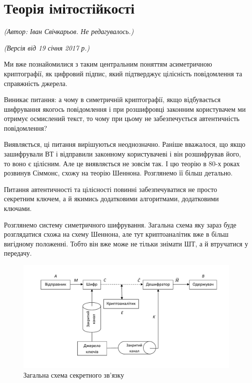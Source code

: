 \section{Теорія імітостійкості}
\begin{flushright}
\emph{(Автор: Іван Свічкарьов. Не редагувалось.)}
\par \emph{(Версія від 19 січня 2017 р.)}
\end{flushright}

Ми вже познайомилися з таким центральним поняттям асиметричною криптографії, як цифровий підпис, який підтверджує цілісність повідомлення та справжність джерела. \par
Виникає питання: а чому в симетричній криптографії, якщо відбувається шифрування якогось повідомлення і при розшифровці законним користувачем ми отримує осмислений текст, то чому при цьому не забезпечується автентичність повідомлення? \par
 Виявляється, ці питання вирішуються неоднозначно. Раніше вважалося, що якщо зашифрували ВТ і відправили законному користувачеві і він розшифрував його, то воно є цілісним. Але це виявляється не зовсім так. І цю теорію в 80-х роках розвинув Сіммонс, схожу на теорію Шеннона. Розглянемо її більш детально. \par
Питання автентичності та цілісності повинні забезпечуватися не просто секретним ключем, а й якимись додатковими алгоритмами, додатковими ключами. \par
Розглянемо систему симетричного шифрування. Загальна схема яку зараз буде розглядатися схожа на схему Шеннона, але тут криптоаналітик вже в більш вигідному положенні. Тобто він вже може не тільки знімати ШТ, а й втручатися у передачу.

\begin{figure}[h]
\includegraphics[width=\textwidth]{scheme}
\caption{Загальна схема секретного зв'язку}
\label{im:S_scheme}
\end{figure} 

